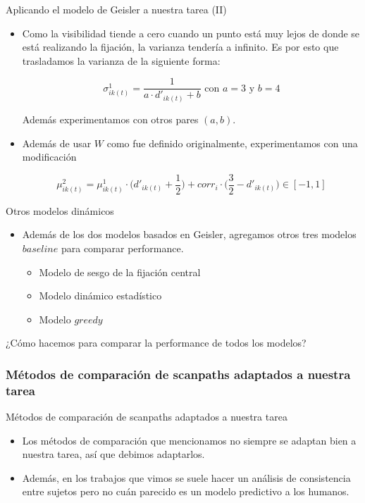 \documentclass[compress]{beamer}
\begin{document}
\begin{frame}{Aplicando el modelo de Geisler a nuestra tarea (II)}
\begin{itemize}
\item Como la visibilidad tiende a cero cuando un punto está muy lejos de donde se está realizando la fijación, la varianza tendería a infinito. Es por esto que trasladamos la varianza de la siguiente forma:

$$ \sigma_{ik(t)}^1 = \displaystyle\frac{1}{a \cdot d'_{ik(t)} + b} \text{ con } a = 3 \text{ y } b = 4$$ 

Además experimentamos con otros pares $(a,b)$.
\item Además de usar $W$ como fue definido originalmente, experimentamos con una modificación 

$$\mu_{ik(t)}^2 = \mu^1_{ik(t)} \cdot \Big(d'_{ik(t)} + \dfrac{1}{2}\Big) + corr_{i} \cdot \Big(\dfrac{3}{2} - d'_{ik(t)}\Big) \in [-1, 1]$$

\end{itemize}
\end{frame}

\begin{frame}{Otros modelos dinámicos}
\begin{itemize}
\item Además de los dos modelos basados en Geisler, agregamos otros tres modelos $baseline$ para comparar performance.
\begin{itemize}
\item Modelo de sesgo de la fijación central
\item Modelo dinámico estadístico
\item Modelo $greedy$
\end{itemize}
\end{itemize}

\bigskip
¿Cómo hacemos para comparar la performance de todos los modelos?

\end{frame}

\subsubsection{Métodos de comparación de scanpaths adaptados a nuestra tarea}
\begin{frame}{Métodos de comparación de scanpaths adaptados a nuestra tarea}

\begin{itemize}
\item Los métodos de comparación que mencionamos no siempre se adaptan bien a nuestra tarea, así que debimos adaptarlos.
\item Además, en los trabajos que vimos se suele hacer un análisis de consistencia entre sujetos pero no cuán parecido es un modelo predictivo a los humanos.
\end{itemize}
\end{frame}
\end{document}
